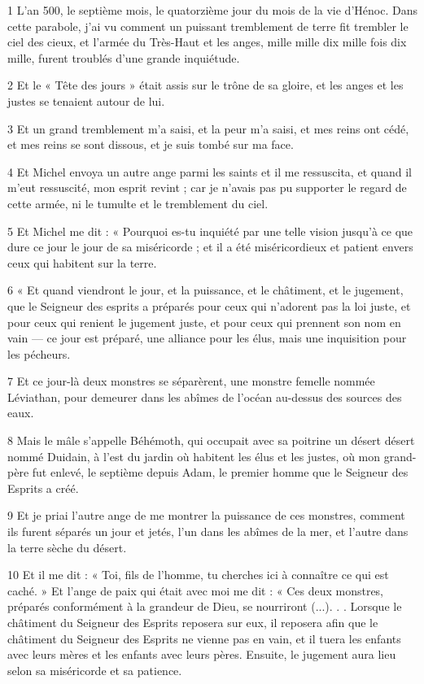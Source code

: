 \par 1 L'an 500, le septième mois, le quatorzième jour du mois de la vie d'Hénoc. Dans cette parabole, j'ai vu comment un puissant tremblement de terre fit trembler le ciel des cieux, et l'armée du Très-Haut et les anges, mille mille dix mille fois dix mille, furent troublés d'une grande inquiétude.
\par 2 Et le « Tête des jours » était assis sur le trône de sa gloire, et les anges et les justes se tenaient autour de lui.
\par 3 Et un grand tremblement m'a saisi, et la peur m'a saisi, et mes reins ont cédé, et mes reins se sont dissous, et je suis tombé sur ma face.
\par 4 Et Michel envoya un autre ange parmi les saints et il me ressuscita, et quand il m'eut ressuscité, mon esprit revint ; car je n'avais pas pu supporter le regard de cette armée, ni le tumulte et le tremblement du ciel.
\par 5 Et Michel me dit : « Pourquoi es-tu inquiété par une telle vision jusqu'à ce que dure ce jour le jour de sa miséricorde ; et il a été miséricordieux et patient envers ceux qui habitent sur la terre.
\par 6 « Et quand viendront le jour, et la puissance, et le châtiment, et le jugement, que le Seigneur des esprits a préparés pour ceux qui n'adorent pas la loi juste, et pour ceux qui renient le jugement juste, et pour ceux qui prennent son nom en vain — ce jour est préparé, une alliance pour les élus, mais une inquisition pour les pécheurs.
\par 7 Et ce jour-là deux monstres se séparèrent, une monstre femelle nommée Léviathan, pour demeurer dans les abîmes de l'océan au-dessus des sources des eaux.
\par 8 Mais le mâle s'appelle Béhémoth, qui occupait avec sa poitrine un désert désert nommé Duidain, à l'est du jardin où habitent les élus et les justes, où mon grand-père fut enlevé, le septième depuis Adam, le premier homme que le Seigneur des Esprits a créé.
\par 9 Et je priai l'autre ange de me montrer la puissance de ces monstres, comment ils furent séparés un jour et jetés, l'un dans les abîmes de la mer, et l'autre dans la terre sèche du désert.
\par 10 Et il me dit : « Toi, fils de l'homme, tu cherches ici à connaître ce qui est caché. » Et l'ange de paix qui était avec moi me dit : « Ces deux monstres, préparés conformément à la grandeur de Dieu, se nourriront (...). . . Lorsque le châtiment du Seigneur des Esprits reposera sur eux, il reposera afin que le châtiment du Seigneur des Esprits ne vienne pas en vain, et il tuera les enfants avec leurs mères et les enfants avec leurs pères. Ensuite, le jugement aura lieu selon sa miséricorde et sa patience.
